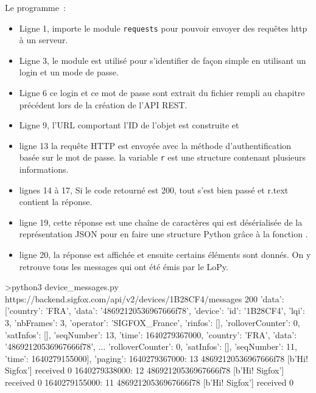 
Le programme~:
\begin{itemize}
    \item Ligne 1, importe le module \texttt{requests} pour pouvoir envoyer des requêtes http à un serveur.
    \item Ligne 3, le module  est utilisé pour s'identifier de façon simple en utilisant un login et un mode de passe.
    \item Ligne 6 ce login et ce mot de passe sont extrait du fichier rempli au chapitre précédent lors de la création de l'API REST.
    \item Ligne 9, l’URL comportant l’ID de l'objet est construite et 
    \item ligne 13 la requête HTTP est envoyée avec la méthode d’authentification basée sur le mot de passe. la variable  \texttt{r} est une structure contenant plusieurs informations. 
    \item lignes 14 à 17, Si le code retourné est 200, tout s’est bien passé et r.text contient la réponse.
    \item ligne 19, cette réponse est une chaîne de caractères qui est désérialisée de la représentation JSON pour en faire une structure Python grâce à la fonction .
    \item ligne 20, la réponse est affichée et ensuite certains éléments sont donnés. On y retrouve tous les messages qui ont été émis par le LoPy.
    \end{itemize}


\begin{termc}[backgroundcolor=\color{palerod}, basicstyle=\ttfamily\small, escapechar=@]
>python3 device_messages.py
https://backend.sigfox.com/api/v2/devices/1B28CF4/messages
200
{'data': [{'country': 'FRA',
           'data': '48692120536967666f78',
           'device': {'id': '1B28CF4'},
           'lqi': 3,
           'nbFrames': 3,
           'operator': 'SIGFOX_France',
           'rinfos': [],
           'rolloverCounter': 0,
           'satInfos': [],
           'seqNumber': 13,
           'time': 1640279367000},
          {'country': 'FRA',
           'data': '48692120536967666f78',
  ...
           'rolloverCounter': 0,
           'satInfos': [],
           'seqNumber': 11,
           'time': 1640279155000}],
 'paging': {}}
1640279367000: 13 48692120536967666f78  [b'Hi! Sigfox']  received 0
1640279338000: 12 48692120536967666f78  [b'Hi! Sigfox']  received 0
1640279155000: 11 48692120536967666f78   [b'Hi! Sigfox']  received 0
\end{termc}

